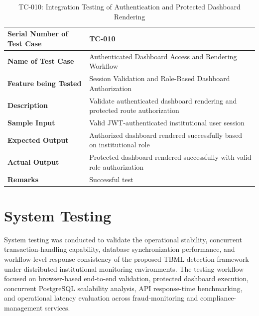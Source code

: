 \begin{table}[H]
\centering
\caption{TC-010: Integration Testing of Authentication and Protected Dashboard Rendering}
\label{tab:auth_dashboard_integration_test}
\vspace{0.2cm}

\begin{tabular}{|p{4.2cm}|p{9cm}|}
\hline
\textbf{Serial Number of Test Case} & TC-010 \\ \hline
\textbf{Name of Test Case} & Authenticated Dashboard Access and Rendering Workflow \\ \hline
\textbf{Feature being Tested} & Session Validation and Role-Based Dashboard Authorization \\ \hline
\textbf{Description} & Validate authenticated dashboard rendering and protected route authorization \\ \hline
\textbf{Sample Input} & Valid JWT-authenticated institutional user session \\ \hline
\textbf{Expected Output} & Authorized dashboard rendered successfully based on institutional role \\ \hline
\textbf{Actual Output} & Protected dashboard rendered successfully with valid role authorization \\ \hline
\textbf{Remarks} & Successful test \\ \hline
\end{tabular}
\end{table}

\renewcommand{\arraystretch}{1}

\section[System Testing]{\textbf{System Testing}}

System testing was conducted to validate the operational stability, concurrent transaction-handling capability, database synchronization performance, and workflow-level response consistency of the proposed TBML detection framework under distributed institutional monitoring environments. The testing workflow focused on browser-based end-to-end validation, protected dashboard execution, concurrent PostgreSQL scalability analysis, API response-time benchmarking, and operational latency evaluation across fraud-monitoring and compliance-management services.

